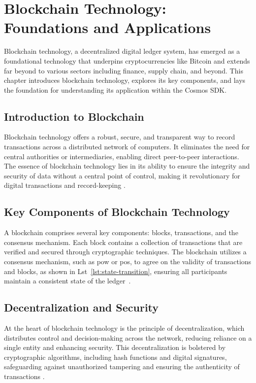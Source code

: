 \chapter{Blockchain Technology: Foundations and Applications}
\label{chap:blockchain_technology}

Blockchain technology, a decentralized digital ledger system, has emerged as a foundational technology that underpins cryptocurrencies like Bitcoin and extends far beyond to various sectors including finance, supply chain, and beyond. This chapter introduces blockchain technology, explores its key components, and lays the foundation for understanding its application within the Cosmos SDK.

\section{Introduction to Blockchain}
Blockchain technology offers a robust, secure, and transparent way to record transactions across a distributed network of computers. It eliminates the need for central authorities or intermediaries, enabling direct peer-to-peer interactions. The essence of blockchain technology lies in its ability to ensure the integrity and security of data without a central point of control, making it revolutionary for digital transactions and record-keeping \cite{nakamoto2008bitcoin, tapscott2016blockchain}.

\section{Key Components of Blockchain Technology}
A blockchain comprises several key components: blocks, transactions, and the consensus mechanism. Each block contains a collection of transactions that are verified and secured through cryptographic techniques. The blockchain utilizes a consensus mechanism, such as \gls{pow} or \gls{pos}, to agree on the validity of transactions and blocks, as shown in Lst~\ref{lst:state-transition}, ensuring all participants maintain a consistent state of the ledger~\cite{antonopoulos2014mastering, buterin2014next}.

\section{Decentralization and Security}
At the heart of blockchain technology is the principle of decentralization, which distributes control and decision-making across the network, reducing reliance on a single entity and enhancing security. This decentralization is bolstered by cryptographic algorithms, including hash functions and digital signatures, safeguarding against unauthorized tampering and ensuring the authenticity of transactions \cite{narayanan2016bitcoin}.

